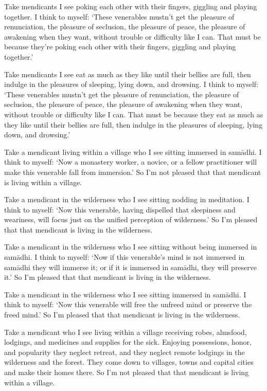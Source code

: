 \documentclass[12pt,openany]{book}%
\begin{document}
Take mendicants I see poking each other with their fingers, giggling and playing together. I think to myself: ‘These venerables mustn’t get the pleasure of renunciation, the pleasure of seclusion, the pleasure of peace, the pleasure of awakening when they want, without trouble or difficulty like I can. That must be because they’re poking each other with their fingers, giggling and playing together.’ 

Take mendicants I see eat as much as they like until their bellies are full, then indulge in the pleasures of sleeping, lying down, and drowsing. I think to myself: ‘These venerables mustn’t get the pleasure of renunciation, the pleasure of seclusion, the pleasure of peace, the pleasure of awakening when they want, without trouble or difficulty like I can. That must be because they eat as much as they like until their bellies are full, then indulge in the pleasures of sleeping, lying down, and drowsing.’ 

Take a mendicant living within a village who I see sitting immersed in \textsanskrit{samādhi}. I think to myself: ‘Now a monastery worker, a novice, or a fellow practitioner will make this venerable fall from immersion.’ So I’m not pleased that that mendicant is living within a village. 

Take a mendicant in the wilderness who I see sitting nodding in meditation. I think to myself: ‘Now this venerable, having dispelled that sleepiness and weariness, will focus just on the unified perception of wilderness.’ So I’m pleased that that mendicant is living in the wilderness. 

Take a mendicant in the wilderness who I see sitting without being immersed in \textsanskrit{samādhi}. I think to myself: ‘Now if this venerable’s mind is not immersed in \textsanskrit{samādhi} they will immerse it; or if it is immersed in \textsanskrit{samādhi}, they will preserve it.’ So I’m pleased that that mendicant is living in the wilderness. 

Take a mendicant in the wilderness who I see sitting immersed in \textsanskrit{samādhi}. I think to myself: ‘Now this venerable will free the unfreed mind or preserve the freed mind.’ So I’m pleased that that mendicant is living in the wilderness. 

Take a mendicant who I see living within a village receiving robes, almsfood, lodgings, and medicines and supplies for the sick. Enjoying possessions, honor, and popularity they neglect retreat, and they neglect remote lodgings in the wilderness and the forest. They come down to villages, towns and capital cities and make their homes there. So I’m not pleased that that mendicant is living within a village. 
\end{document}
